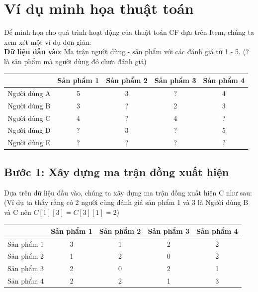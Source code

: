 \documentclass{report}
\begin{document}
\raggedright
\section{Ví dụ minh họa thuật toán}
Để minh họa cho quá trình hoạt động của thuật toán CF dựa trên Item,
chúng ta xem xét một ví dụ đơn giản:\\
\vspace{0.5cm}
\textbf{Dữ liệu đầu vào}: Ma trận người dùng -
sản phẩm với các đánh giá từ 1 - 5. (? là sản phẩm mà người dùng đó chưa đánh giá)\\
\renewcommand{\arraystretch}{2}
{\centering
    \begin{tabular}{ |c|c|c|c|c| }
        \hline
                     & Sản phẩm 1 & Sản phẩm 2 & Sản phẩm 3 & Sản phẩm 4 \\
        \hline
        Người dùng A & 5          & 3          & ?          & 4          \\
        \hline
        Người dùng B & 3          & ?          & 2          & 3          \\
        \hline
        Người dùng C & 4          & ?          & 4          & ?          \\
        \hline
        Người dùng D & ?          & 3          & ?          & 5          \\
        \hline
        Người dùng E & ?          & ?          & ?          & ?          \\
        \hline
    \end{tabular}
    \par}

\subsection*{Bước 1: Xây dựng ma trận đồng xuất hiện}
Dựa trên dữ liệu đầu vào, chúng ta xây dựng ma trận đồng xuất hiện C như sau:
(Ví dụ ta thấy rằng có 2 người cùng đánh giá sản phẩm 1 và 3 là Người dùng B và C
nên $C[1][3] = C[3][1] = 2$)\\
\vspace{0.2cm}
{\centering
    \begin{tabular}{ |c|c|c|c|c| }
        \hline
                   & Sản phẩm 1 & Sản phẩm 2 & Sản phẩm 3 & Sản phẩm 4 \\
        \hline
        Sản phẩm 1 & 3          & 1          & 2          & 2          \\
        \hline
        Sản phẩm 2 & 1          & 2          & 0          & 2          \\
        \hline
        Sản phẩm 3 & 2          & 0          & 2          & 1          \\
        \hline
        Sản phẩm 4 & 2          & 2          & 1          & 3          \\
        \hline
    \end{tabular}
    \par}
\end{document}
